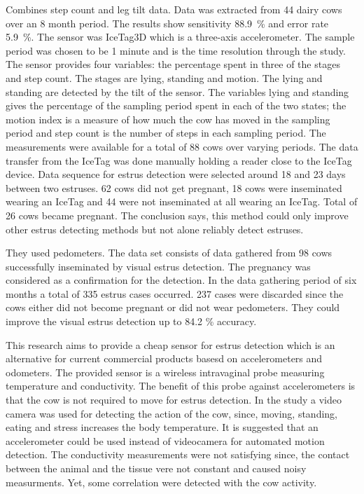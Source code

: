 \documentclass[english,12pt,a4paper,pdftex,elec,utf8]{aaltothesis}
\begin{document}
Combines step count and leg tilt data. Data was extracted from 44 dairy cows over an 8 month period. The results show sensitivity \SI{88.9}{\percent} and error rate \SI{5.9}{\percent}. The sensor was IceTag3D \circledR which is a three-axis accelerometer. The sample period was chosen to be 1 minute and is the time resolution through the study. The sensor provides four variables: the percentage spent in three of the stages and step count. The stages are lying, standing and motion. The lying and standing are detected by the tilt of the sensor. The variables lying and standing gives the percentage of the sampling period spent in each of the two states; the motion index is a measure of how much the cow has moved in the sampling period and step count is the number of steps in each sampling period. The measurements were available for a total of 88 cows over varying periods. The data transfer from the IceTag was done manually holding a reader close to the IceTag device. Data sequence for estrus detection were selected around 18 and 23 days between two estruses. 62 cows did not get pregnant, 18 cows were inseminated wearing an IceTag and 44 were not inseminated at all wearing an IceTag. Total of 26 cows became pregnant. The conclusion says, this method could only improve other estrus detecting methods but not alone reliably detect estruses.
\cite{Jonsson20116}



They used pedometers. The data set consists of data gathered from 98 cows successfully inseminated by visual estrus detection. The pregnancy was considered as a confirmation for the detection. In the data gathering period of six months a total of 335 estrus cases occurred. 237 cases were discarded since the cows either did not become pregnant or did not wear pedometers. They could improve the visual estrus detection up to 84.2 \% accuracy. 
\cite{BRUNASSI2010}




This research aims to provide a cheap sensor for estrus detection which is an alternative for current commercial products basesd on accelerometers and odometers. The provided sensor is a wireless intravaginal probe measuring temperature and conductivity. The benefit of this probe against accelerometers is that the cow is not required to move for estrus detection. In the study a video camera was used for detecting the action of the cow, since, moving, standing, eating and stress increases the body temperature. It is suggested that an accelerometer could be used instead of videocamera for automated motion detection. The conductivity measurements were not satisfying since, the contact between the animal and the tissue vere not constant and caused noisy measurments. Yet, some correlation were detected with the cow activity.  \cite{7370219}
\end{document}
